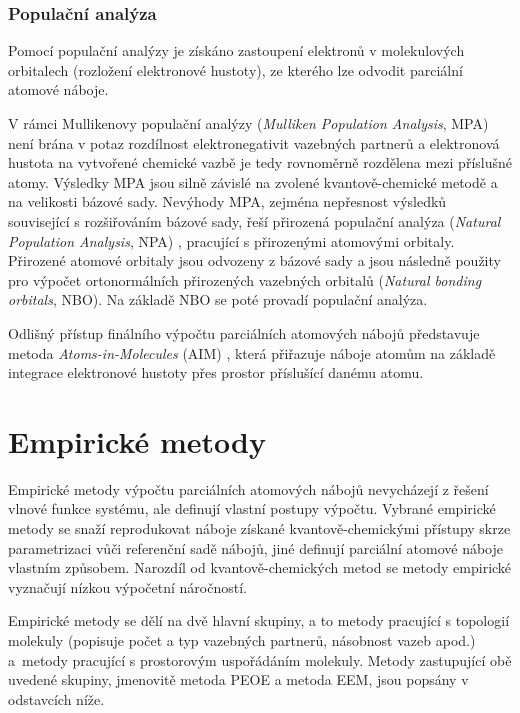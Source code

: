 \subsubsection{Populační analýza}
Pomocí populační analýzy je získáno zastoupení elektronů v molekulových orbitalech (rozložení elektronové hustoty), ze kterého lze odvodit parciální atomové náboje. 

V rámci Mullikenovy populační analýzy (\textit{Mulliken Population Analysis}, MPA) \cite{MPA} není brána v potaz rozdílnost elektronegativit vazebných partnerů a elektronová hustota na vytvořené chemické vazbě je tedy rovnoměrně rozdělena mezi příslušné atomy. Výsledky MPA jsou silně závislé na zvolené kvantově-chemické metodě a na velikosti bázové sady. Nevýhody MPA, zejména nepřesnost výsledků související s rozšiřováním bázové sady, řeší přirozená populační analýza (\textit{Natural Population Analysis}, NPA) \cite{NPA}, pracující s přirozenými atomovými orbitaly. Přirozené atomové orbitaly jsou odvozeny z bázové sady a jsou následně použity pro výpočet ortonormálních přirozených vazebných orbitalů (\textit{Natural bonding orbitals}, NBO). Na základě NBO se poté provadí populační analýza.

Odlišný přístup finálního výpočtu parciálních atomových nábojů představuje metoda \textit{Atoms-in-Molecules} (AIM) \cite{AIM}, která přiřazuje náboje atomům na základě integrace elektronové hustoty přes prostor příslušící danému atomu. 

\section{Empirické metody}
Empirické metody výpočtu parciálních atomových nábojů nevycházejí z řešení vlnové funkce systému, ale definují vlastní postupy výpočtu. Vybrané empirické metody se snaží reprodukovat náboje získané kvantově-chemickými přístupy skrze parametrizaci vůči referenční sadě nábojů, jiné definují parciální atomové náboje vlastním způsobem. Narozdíl od kvantově-chemických metod se metody empirické vyznačují nízkou výpočetní náročností.

Empirické metody se dělí na dvě hlavní skupiny, a to metody pracující s topologií molekuly (popisuje počet a typ vazebných partnerů, násobnost vazeb apod.) a~metody pracující s prostorovým uspořádáním molekuly. Metody zastupující obě uvedené skupiny, jmenovitě metoda PEOE a metoda EEM, jsou popsány v odstavcích níže.

